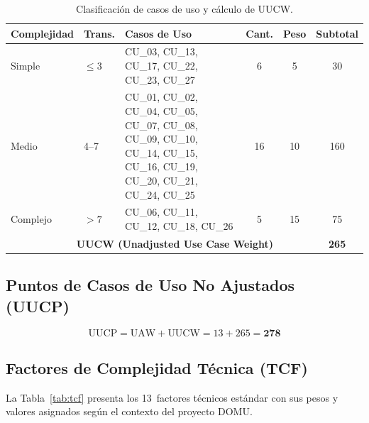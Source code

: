 \begin{table}[H]
\centering
\begin{tabular}{|p{}|p{}|p{}|c|c|c|}
\hline
\textbf{Complejidad} & \textbf{Trans.} & \textbf{Casos de Uso} & \textbf{Cant.} & \textbf{Peso} & \textbf{Subtotal} \\
\hline
Simple & $\leq 3$ & CU\_03, CU\_13, CU\_17, CU\_22, CU\_23, CU\_27 & 6 & 5 & 30 \\
\hline
Medio & 4--7 & CU\_01, CU\_02, CU\_04, CU\_05, CU\_07, CU\_08, CU\_09, CU\_10, CU\_14, CU\_15, CU\_16, CU\_19, CU\_20, CU\_21, CU\_24, CU\_25 & 16 & 10 & 160 \\
\hline
Complejo & $> 7$ & CU\_06, CU\_11, CU\_12, CU\_18, CU\_26 & 5 & 15 & 75 \\
\hline
\multicolumn{4}{|r|}{\textbf{UUCW (Unadjusted Use Case Weight)}} & & \textbf{265} \\
\hline
\end{tabular}
\caption{Clasificación de casos de uso y cálculo de UUCW.}
\label{tab:uucw}
\end{table}

\subsection{Puntos de Casos de Uso No Ajustados (UUCP)}

\[
\text{UUCP} = \text{UAW} + \text{UUCW} = 13 + 265 = \mathbf{278}
\]

\subsection{Factores de Complejidad Técnica (TCF)}

La Tabla~\ref{tab:tcf} presenta los 13~factores técnicos estándar con sus pesos y valores asignados según el contexto del proyecto DOMU.

